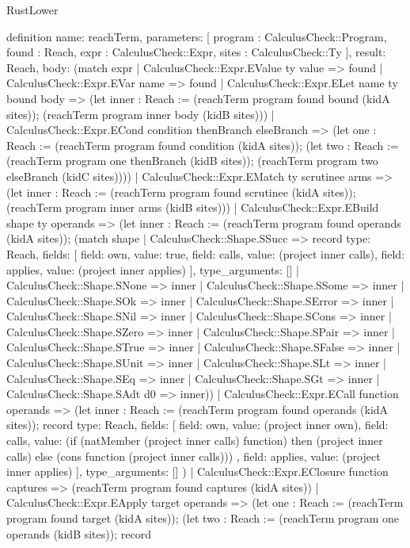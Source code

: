 \begin{lexlean}{RustLower}
\begin{semanticmodule}
definition{
  name: reachTerm,
  parameters: [
    program : CalculusCheck::Program,
    found : Reach,
    expr : CalculusCheck::Expr,
    sites : CalculusCheck::Ty
  ],
  result: Reach,
  body: (match expr
    | CalculusCheck::Expr.EValue ty value => found
    | CalculusCheck::Expr.EVar name => found
    | CalculusCheck::Expr.ELet name ty bound body => (let inner : Reach := (reachTerm program found bound (kidA sites)); (reachTerm program inner body (kidB sites)))
    | CalculusCheck::Expr.ECond condition thenBranch elseBranch => (let one : Reach := (reachTerm program found condition (kidA sites)); (let two : Reach := (reachTerm program one thenBranch (kidB sites)); (reachTerm program two elseBranch (kidC sites))))
    | CalculusCheck::Expr.EMatch ty scrutinee arms => (let inner : Reach := (reachTerm program found scrutinee (kidA sites)); (reachTerm program inner arms (kidB sites)))
    | CalculusCheck::Expr.EBuild shape ty operands => (let inner : Reach := (reachTerm program found operands (kidA sites)); (match shape
      | CalculusCheck::Shape.SSucc => record{
        type: Reach,
        fields: [
          {field: own, value: true},
          {field: calls, value: (project inner calls)},
          {field: applies, value: (project inner applies)}
        ],
        type_arguments: []
      }
      | CalculusCheck::Shape.SNone => inner
      | CalculusCheck::Shape.SSome => inner
      | CalculusCheck::Shape.SOk => inner
      | CalculusCheck::Shape.SError => inner
      | CalculusCheck::Shape.SNil => inner
      | CalculusCheck::Shape.SCons => inner
      | CalculusCheck::Shape.SZero => inner
      | CalculusCheck::Shape.SPair => inner
      | CalculusCheck::Shape.STrue => inner
      | CalculusCheck::Shape.SFalse => inner
      | CalculusCheck::Shape.SUnit => inner
      | CalculusCheck::Shape.SLt => inner
      | CalculusCheck::Shape.SEq => inner
      | CalculusCheck::Shape.SGt => inner
      | CalculusCheck::Shape.SAdt d0 => inner))
    | CalculusCheck::Expr.ECall function operands => (let inner : Reach := (reachTerm program found operands (kidA sites)); record{
      type: Reach,
      fields: [
        {field: own, value: (project inner own)},
        {
          field: calls,
          value: (if (natMember (project inner calls) function) then (project inner calls) else (cons function (project inner calls)))
        },
        {field: applies, value: (project inner applies)}
      ],
      type_arguments: []
    })
    | CalculusCheck::Expr.EClosure function captures => (reachTerm program found captures (kidA sites))
    | CalculusCheck::Expr.EApply target operands => (let one : Reach := (reachTerm program found target (kidA sites)); (let two : Reach := (reachTerm program one operands (kidB sites)); record{
}}
\end{semanticmodule}
\end{lexlean}
